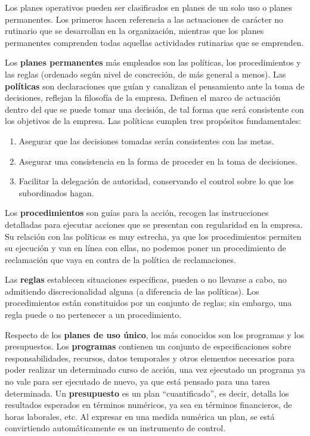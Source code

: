 \documentclass[12pt,a4paper,spanish]{report}
\begin{document}
		Los planes operativos pueden ser clasificados en planes de un solo uso o planes permanentes. Los primeros hacen referencia a las actuaciones de carácter no rutinario que se desarrollan en la organización, mientras que los planes permanentes comprenden todas aquellas actividades rutinarias que se emprenden. 

		Los \textbf{planes permanentes} más empleados son las políticas, los procedimientos y las reglas (ordenado según nivel de concreción, de más general a menos). Las \textbf{políticas} son declaraciones que guían y canalizan el pensamiento ante la toma de decisiones, reflejan la filosofía de la empresa. Definen el marco de actuación dentro del que se puede tomar una decisión, de tal forma que será consistente con los objetivos de la empresa. Las políticas cumplen tres propósitos fundamentales:
		\begin{enumerate}[-]
			\item Asegurar que las decisiones tomadas serán consistentes con las metas.

			\item Asegurar una consistencia en la forma de proceder en la toma de decisiones.

			\item Facilitar la delegación de autoridad, conservando el control sobre lo que los subordinados hagan.
		\end{enumerate}

		Los \textbf{procedimientos} son guías para la acción, recogen las instrucciones detalladas para ejecutar acciones que se presentan con regularidad en la empresa. Su relación con las políticas es muy estrecha, ya que los procedimientos permiten su ejecución y van en línea con ellas, no podemos poner un procedimiento de reclamación que vaya en contra de la política de reclamaciones.

		Las \textbf{reglas} establecen situaciones específicas, pueden o no llevarse a cabo, no admitiendo discrecionalidad alguna (a diferencia de las políticas). Los procedimientos están constituidos por un conjunto de reglas; sin embargo, una regla puede o no pertenecer a un procedimiento.

		Respecto de los \textbf{planes de uso único}, los más conocidos son los programas y los presupuestos. Los \textbf{programas} contienen un conjunto de especificaciones sobre responsabilidades, recursos, datos temporales y otros elementos necesarios para poder realizar un determinado curso de acción, una vez ejecutado un programa ya no vale para ser ejecutado de nuevo, ya que está pensado para una tarea determinada. Un \textbf{presupuesto} es un plan ``cuantificado'', es decir, detalla los resultados esperados en términos numéricos, ya sea en términos financieros, de horas laborales, etc. Al expresar en una medida numérica un plan, se está convirtiendo automáticamente es un instrumento de control.
\end{document}
